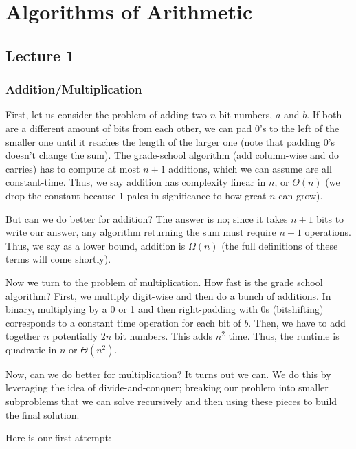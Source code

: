 \section{Algorithms of Arithmetic}

\subsection{Lecture 1}

\subsubsection{Addition/Multiplication}

First, let us consider the problem of adding two $n$-bit numbers, $a$ and $b$. If both are a different amount of bits from each other,
we can pad 0's to the left of the smaller one until it reaches the length of the larger one (note that padding 0's doesn't change the sum).
The grade-school algorithm (add column-wise and do carries)
has to compute at most $n + 1$ additions, which we can assume are all constant-time. Thus, we say addition has complexity linear in $n$,
or $\Theta(n)$ (we drop the constant because 1 pales in significance to how great $n$ can grow).

But can we do better for addition? The answer is no; since it takes $n + 1$ bits to write our answer, any algorithm returning the sum
must require $n + 1$ operations. Thus, we say as a lower bound, addition is $\Omega(n)$ (the full definitions of these terms will come shortly).

Now we turn to the problem of multiplication. How fast is the grade school algorithm? First, we multiply digit-wise and then do a bunch of additions.
In binary, multiplying by a 0 or 1 and then right-padding with 0s (bitshifting) corresponds to a constant time operation for each bit of $b$.
Then, we have to add together $n$ potentially $2n$ bit numbers. This adds $n^2$ time. Thus, the runtime is quadratic in $n$
or $\Theta(n^2)$.

Now, can we do better for multiplication? It turns out we can. We do this by leveraging the idea of divide-and-conquer;
breaking our problem into smaller subproblems that we can solve recursively and then using these pieces to build the final solution.

Here is our first attempt:

